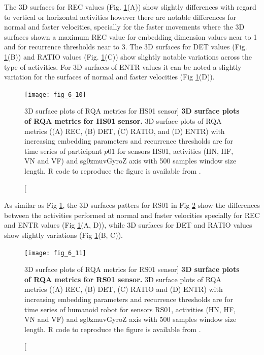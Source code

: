 The 3D surfaces for REC values (Fig. \ref{fig:topo_sa_hs01}(A))
show slightly differences with regard to vertical or horizontal activities
however there are notable differences for normal and faster velocities, 
specially for the faster movements where the 3D surfaces shown a maximum
REC value for embedding dimension values near to 1 and for recurrence 
thresholds near to 3. 
The 3D surfaces for DET values  
(Fig. \ref{fig:topo_sa_hs01}(B)) and RATIO values 
(Fig. \ref{fig:topo_sa_hs01}(C)) show slightly notable variations across 
the type of activities. 
For 3D surfaces of ENTR values it can be noted a slightly variation for
the surfaces of normal and faster velocities (Fig \ref{fig:topo_sa_hs01}(D)).
\begin{figure}
\centering
\texttt{[image: fig\_6\_10]}
    \caption
	[3D surface plots of RQA metrics for HS01 sensor]{
	{\bf 3D surface plots of RQA metrics for HS01 sensor.}
	3D surface plots of RQA metrics ((A) REC, (B) DET, (C) RATIO, and (D) ENTR) 
	with increasing embedding parameters and recurrence thresholds 
	are for time series of participant $p01$ for 
	sensors HS01, activities (HN, HF, VN and VF) and 
	sg0zmuvGyroZ axis with 500 samples window size length. 
	R code to reproduce the figure is available from \cite{xochicale2018}.
       }
\label{fig:topo_sa_hs01}
\end{figure}

As similar as Fig \ref{fig:topo_sa_hs01}, the 3D surfaces patters 
for RS01 in Fig \ref{fig:topo_sa_rs01} show the differences between 
the activities performed at normal and faster velocities
specially for REC and ENTR values (Fig \ref{fig:topo_sa_hs01}(A, D)),
while 3D surfaces for DET and RATIO values show slightly variations
(Fig \ref{fig:topo_sa_hs01}(B, C)).
\begin{figure}
\centering
\texttt{[image: fig\_6\_11]}
    \caption
	[3D surface plots of RQA metrics for RS01 sensor]{
	{\bf 3D surface plots of RQA metrics for RS01 sensor.}
	3D surface plots of RQA metrics ((A) REC, (B) DET, (C) RATIO and (D) ENTR) 
	with increasing embedding parameters and recurrence thresholds 
	are for time series of humanoid robot for 
	sensors RS01, activities (HN, HF, VN and VF) and 
	sg0zmuvGyroZ axis with 500 samples window size length. 
	R code to reproduce the figure is available from \cite{xochicale2018}.
       }
\label{fig:topo_sa_rs01}
\end{figure}

